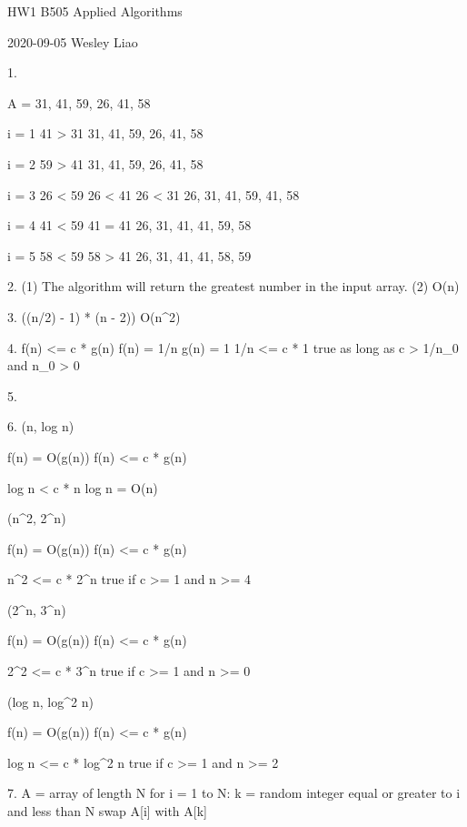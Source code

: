 HW1 B505 Applied Algorithms

2020-09-05
Wesley Liao


1.

A = 31, 41, 59, 26, 41, 58

i = 1
41 > 31
31, 41, 59, 26, 41, 58

i = 2
59 > 41
31, 41, 59, 26, 41, 58

i = 3
26 < 59
26 < 41
26 < 31
26, 31, 41, 59, 41, 58

i = 4
41 < 59
41 = 41
26, 31, 41, 41, 59, 58

i = 5
58 < 59
58 > 41
26, 31, 41, 41, 58, 59


2.
 (1) The algorithm will return the greatest number in the input array.
 (2) O(n)


3.
((n/2) - 1) * (n - 2))
O(n^2)


4.
f(n) <= c * g(n)
f(n) = 1/n
g(n) = 1
1/n <= c * 1
true as long as c > 1/n_0 and n_0 > 0

5.


6.
(n, log n)

    f(n) = O(g(n))
    f(n) <= c * g(n)

    log n < c * n
    log n = O(n)


(n^2, 2^n)

    f(n) = O(g(n))
    f(n) <= c * g(n)

    n^2 <= c * 2^n
    true if c >= 1 and n >= 4


(2^n, 3^n)

    f(n) = O(g(n))
    f(n) <= c * g(n)

    2^2 <= c * 3^n
    true if c >= 1 and n >= 0


(log n, log^2 n)

    f(n) = O(g(n))
    f(n) <= c * g(n)

    log n  <= c * log^2 n
    true if c >= 1 and n >= 2


7.
A = array of length N
for i = 1 to N:
    k = random integer equal or greater to i and less than N
    swap A[i] with A[k]
